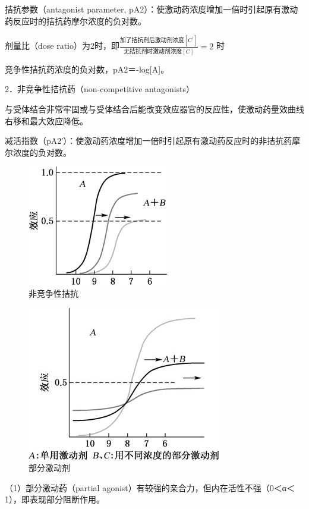 拮抗参数（antagonist parameter,
pA2）：使激动药浓度增加一倍时引起原有激动药反应时的拮抗药摩尔浓度的负对数。

剂量比（dose ratio）为2时，即$\frac{\text{加了拮抗剂后激动剂浓度}[C^\prime]}{\text{无拮抗剂时激动剂浓度}[C]}=2$
时

竞争性拮抗药浓度的负对数，pA2＝-log{[}A{]}。

2．非竞争性拮抗药（non-competitive antagonists）

与受体结合非常牢固或与受体结合后能改变效应器官的反应性，使激动药量效曲线右移和最大效应降低。

减活指数（pA2′）：使激动药浓度增加一倍时引起原有激动药反应时的非拮抗药摩尔浓度的负对数。

\begin{figure}[!htbp]
 \centering
 \includegraphics{./images/Image00011.jpg}
 \captionsetup{justification=centering}
 \caption{非竞争性拮抗}
 \label{fig2-7}
  \end{figure} 

\begin{figure}[!htbp]
 \centering
 \includegraphics{./images/Image00012.jpg}
 \captionsetup{justification=centering}
 \caption{部分激动剂}
 \label{fig2-8}
  \end{figure} 

（1）部分激动药（partial
agonist）有较强的亲合力，但内在活性不强（0＜α＜1），即表现部分阻断作用。

